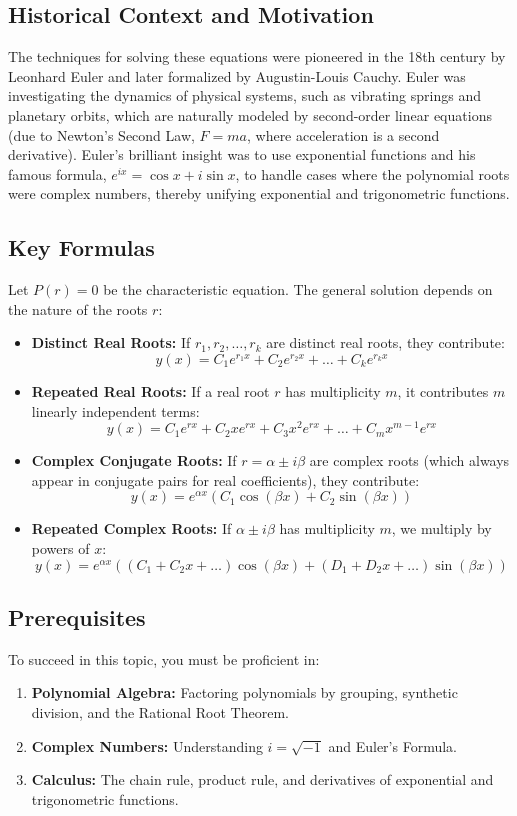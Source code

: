 \documentclass[11pt]{article}
\begin{document}
\subsection{Historical Context and Motivation}
The techniques for solving these equations were pioneered in the 18th century by Leonhard Euler and later formalized by Augustin-Louis Cauchy. Euler was investigating the dynamics of physical systems, such as vibrating springs and planetary orbits, which are naturally modeled by second-order linear equations (due to Newton's Second Law, $F=ma$, where acceleration is a second derivative). Euler's brilliant insight was to use exponential functions and his famous formula, $e^{ix} = \cos x + i \sin x$, to handle cases where the polynomial roots were complex numbers, thereby unifying exponential and trigonometric functions.

\subsection{Key Formulas}
Let $P(r) = 0$ be the characteristic equation. The general solution depends on the nature of the roots $r$:
\begin{itemize}
    \item \textbf{Distinct Real Roots:} If $r_1, r_2, \dots, r_k$ are distinct real roots, they contribute:
    \[ y(x) = C_1 e^{r_1 x} + C_2 e^{r_2 x} + \dots + C_k e^{r_k x} \]
    \item \textbf{Repeated Real Roots:} If a real root $r$ has multiplicity $m$, it contributes $m$ linearly independent terms:
    \[ y(x) = C_1 e^{rx} + C_2 x e^{rx} + C_3 x^2 e^{rx} + \dots + C_m x^{m-1} e^{rx} \]
    \item \textbf{Complex Conjugate Roots:} If $r = \alpha \pm i\beta$ are complex roots (which always appear in conjugate pairs for real coefficients), they contribute:
    \[ y(x) = e^{\alpha x} (C_1 \cos(\beta x) + C_2 \sin(\beta x)) \]
    \item \textbf{Repeated Complex Roots:} If $\alpha \pm i\beta$ has multiplicity $m$, we multiply by powers of $x$:
    \[ y(x) = e^{\alpha x} \left( (C_1 + C_2 x + \dots) \cos(\beta x) + (D_1 + D_2 x + \dots) \sin(\beta x) \right) \]
\end{itemize}

\subsection{Prerequisites}
To succeed in this topic, you must be proficient in:
\begin{enumerate}
    \item \textbf{Polynomial Algebra:} Factoring polynomials by grouping, synthetic division, and the Rational Root Theorem.
    \item \textbf{Complex Numbers:} Understanding $i = \sqrt{-1}$ and Euler's Formula.
    \item \textbf{Calculus:} The chain rule, product rule, and derivatives of exponential and trigonometric functions.
\end{enumerate}
\end{document}
